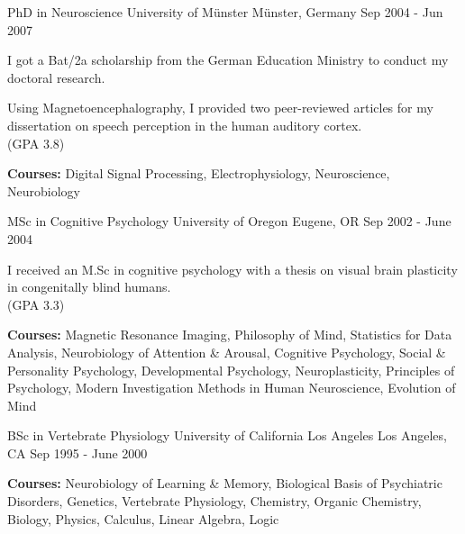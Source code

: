 

\begin{cventries}

  \cventry
    {PhD in Neuroscience} %
    {University of Münster} %
    {Münster, Germany} %
    {Sep 2004 - Jun 2007} %
    {
      \begin{cvitems} %
        \item {I got a Bat/2a scholarship from the German Education Ministry to conduct my doctoral research.}
        \item {Using Magnetoencephalography, I provided two peer-reviewed articles for my dissertation on speech perception in the human auditory cortex.\\(GPA 3.8)}
        \item {\textbf{Courses:} Digital Signal Processing, Electrophysiology, Neuroscience, Neurobiology}
      \end{cvitems}
    }
    
  \cventry
    {MSc in Cognitive Psychology} %
    {University of Oregon} %
    {Eugene, OR} %
    {Sep 2002 - June 2004} %
    {
      \begin{cvitems} %
        \item {I received an M.Sc in cognitive psychology with a thesis on visual brain plasticity in congenitally blind humans.\\(GPA 3.3)}
        \item {}
        \item {\textbf{Courses:} Magnetic Resonance Imaging, Philosophy of Mind, Statistics for Data Analysis, Neurobiology of Attention \& Arousal, Cognitive Psychology,
        Social \& Personality Psychology, Developmental Psychology, Neuroplasticity, Principles of Psychology, Modern Investigation Methods in Human Neuroscience, Evolution of Mind}
      \end{cvitems}
    }
    
  \cventry
    {BSc in Vertebrate Physiology} %
    {University of California Los Angeles} %
    {Los Angeles, CA} %
    {Sep 1995 - June 2000} %
    {
      \begin{cvitems} %
        \item {}
        \item {}
        \item {\textbf{Courses:} Neurobiology of Learning \& Memory, Biological Basis of Psychiatric Disorders, Genetics, Vertebrate Physiology, Chemistry, Organic Chemistry, Biology, Physics, Calculus, Linear Algebra, Logic}
      \end{cvitems}
    }
\end{cventries}
